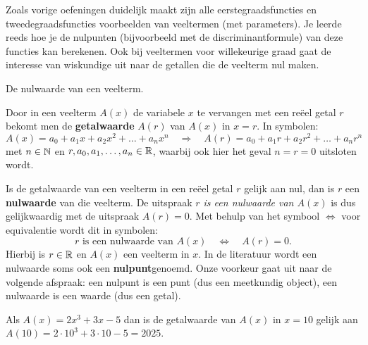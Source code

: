 \documentclass{ximera}
\begin{document}
\begin{exercise}
                                                                                                                                                                                                                                                                                                                                                            
\end{exercise}
 
Zoals vorige oefeningen duidelijk maakt zijn alle eerstegraadsfuncties en tweedegraadsfuncties voorbeelden van veeltermen (met parameters). 
Je leerde reeds hoe je de nulpunten (bijvoorbeeld met de discriminantformule) van deze functies kan berekenen. 
Ook bij veeltermen voor willekeurige graad gaat de interesse van wiskundige uit naar de getallen die de veelterm nul maken. 


\begin{definition} De nulwaarde van een veelterm. 


    Door in een veelterm $A(x)$ de variabele $x$ te vervangen met een reëel getal $r$ bekomt men de \textbf{getalwaarde} $A(r)$ van $A(x)$ in $x = r$.  In symbolen:
    \[
    A(x) = a_0 + a_1x + a_2x^2 + \dots + a_n x^n \quad 
    \Rightarrow
    \quad A(r) = a_0 + a_1 r + a_2r^2 + \dots + a_n r^n
    \]
    met $n \in \mathbb{N}$ en $r, a_0, a_1, \ldots, a_n \in \mathbb{R}$, waarbij ook hier het geval $n = r = 0$ uitsloten wordt. %
    
    Is de getalwaarde van een veelterm in een reëel getal $r$ gelijk aan nul, dan is $r$ een \textbf{nulwaarde} van die veelterm. De uitspraak \textit{ $r$ is een nulwaarde van $A(x)$} is dus gelijkwaardig met de uitspraak \textit{ $A(r) = 0$}. Met behulp van het symbool $\Leftrightarrow$ voor equivalentie wordt dit in symbolen:
    \[
    r \text{ is een nulwaarde van } A(x) \quad \Leftrightarrow \quad A(r) = 0.
    \]
    Hierbij is $r \in \mathbb{R}$ en $A(x)$ een veelterm in $x$. In de literatuur wordt een nulwaarde soms ook een \textbf{nulpunt}genoemd. Onze voorkeur gaat uit naar de volgende afspraak: een nulpunt is een punt (dus een meetkundig object), een nulwaarde is een waarde (dus een getal).
    
\end{definition} 
    


\begin{example} 
    Als $A(x) = 2x^3+3x-5$ dan is de getalwaarde van $A(x)$ in $x = 10$ gelijk aan $A(10) = 2\cdot 10^3 + 3 \cdot 10 - 5 = 2025$.
\end{example} 
\end{document}
